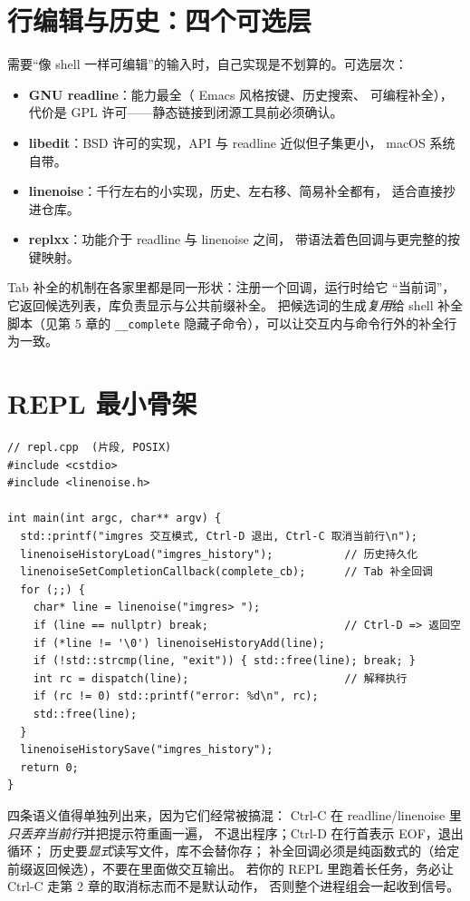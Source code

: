 \documentclass[12pt,a4paper,fontset=fandol]{ctexbook}
\newcommand{\Tp}[1]{\texttt{#1}}
\begin{document}
\section{行编辑与历史：四个可选层}

需要``像 shell 一样可编辑''的输入时，自己实现是不划算的。可选层次：

\begin{itemize}
\item \textbf{GNU readline}：能力最全（ Emacs 风格按键、历史搜索、
      可编程补全），代价是 GPL 许可——静态链接到闭源工具前必须确认。
\item \textbf{libedit}：BSD 许可的实现，API 与 readline 近似但子集更小，
      macOS 系统自带。
\item \textbf{linenoise}：千行左右的小实现，历史、左右移、简易补全都有，
      适合直接抄进仓库。
\item \textbf{replxx}：功能介于 readline 与 linenoise 之间，
      带语法着色回调与更完整的按键映射。
\end{itemize}

Tab 补全的机制在各家里都是同一形状：注册一个回调，运行时给它
``当前词''，它返回候选列表，库负责显示与公共前缀补全。
把候选词的生成\emph{复用}给 shell 补全脚本（见第 5 章的
\Tp{\_\_complete} 隐藏子命令），可以让交互内与命令行外的补全行为一致。

\section{REPL 最小骨架}

\begin{lstlisting}[caption={REPL 的四条控制语义}]
// repl.cpp  (片段, POSIX)
#include <cstdio>
#include <linenoise.h>

int main(int argc, char** argv) {
  std::printf("imgres 交互模式, Ctrl-D 退出, Ctrl-C 取消当前行\n");
  linenoiseHistoryLoad("imgres_history");           // 历史持久化
  linenoiseSetCompletionCallback(complete_cb);      // Tab 补全回调
  for (;;) {
    char* line = linenoise("imgres> ");
    if (line == nullptr) break;                     // Ctrl-D => 返回空
    if (*line != '\0') linenoiseHistoryAdd(line);
    if (!std::strcmp(line, "exit")) { std::free(line); break; }
    int rc = dispatch(line);                        // 解释执行
    if (rc != 0) std::printf("error: %d\n", rc);
    std::free(line);
  }
  linenoiseHistorySave("imgres_history");
  return 0;
}
\end{lstlisting}

四条语义值得单独列出来，因为它们经常被搞混：
Ctrl-C 在 readline/linenoise 里\emph{只丢弃当前行}并把提示符重画一遍，
不退出程序；Ctrl-D 在行首表示 EOF，退出循环；
历史要\emph{显式}读写文件，库不会替你存；
补全回调必须是纯函数式的（给定前缀返回候选），不要在里面做交互输出。
若你的 REPL 里跑着长任务，务必让 Ctrl-C 走第 2 章的取消标志而不是默认动作，
否则整个进程组会一起收到信号。
\end{document}
